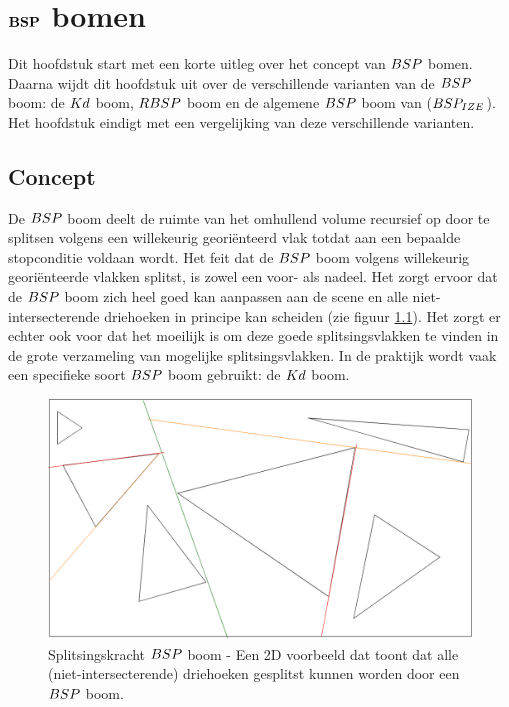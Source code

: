 \chapter{$\mathbf{BSP}$ bomen}
\label{hoofdstuk:voorgaand-werk}
Dit hoofdstuk start met een korte uitleg over het concept van $\symBSP$ bomen.
Daarna wijdt dit hoofdstuk uit over de verschillende varianten van de $\symBSP$ boom: de $Kd$ boom, $RBSP$ boom en de algemene $\symBSP$ boom van \authorIze{} \cite{ize} ($BSP_{IZE}$).
Het hoofdstuk eindigt met een vergelijking van deze verschillende varianten.

\section{Concept}
    De $\symBSP$ boom deelt de ruimte van het omhullend volume recursief op door te splitsen volgens een willekeurig georiënteerd vlak totdat aan een bepaalde stopconditie voldaan wordt.
    Het feit dat de $\symBSP$ boom volgens willekeurig georiënteerde vlakken splitst, is zowel een voor- als nadeel.
    Het zorgt ervoor dat de $\symBSP$ boom zich heel goed kan aanpassen aan de scene en alle niet-intersecterende driehoeken in principe kan scheiden (zie figuur \ref{fig:splitsing-bsp}).
    Het zorgt er echter ook voor dat het moeilijk is om deze goede splitsingsvlakken te vinden in de grote verzameling van mogelijke splitsingsvlakken.
    In de praktijk wordt vaak een specifieke soort $\symBSP$ boom gebruikt: de $Kd$ boom.
    \begin{figure}
        \centering
        \includegraphics[width=\linewidth]{img/splitsing-BSP}
        \caption[Splitsingskracht $\symBSP$ boom]%
        {Splitsingskracht $\symBSP$ boom - \small Een 2D voorbeeld dat toont dat alle (niet-intersecterende) driehoeken gesplitst kunnen worden door een $\symBSP$ boom.}
        \label{fig:splitsing-bsp}    
    \end{figure}    
